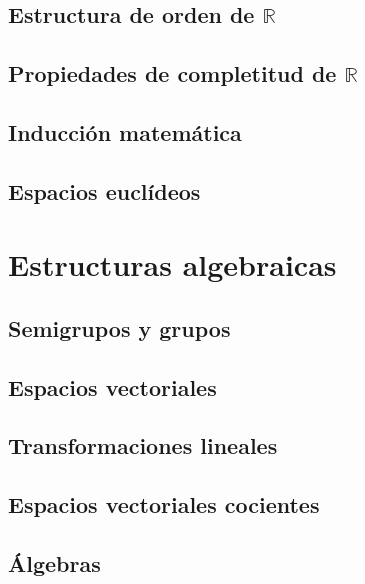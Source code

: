 \documentclass[12pt,]{krantz}
\theoremstyle{definition}
\theoremstyle{definition}
\theoremstyle{definition}
\theoremstyle{remark}
\begin{document}
\section{\texorpdfstring{Estructura de orden de
\(\mathbb{R}\)}{Estructura de orden de \textbackslash{}mathbb\{R\}}}\label{estructura-de-orden-de-mathbbr}

\section{\texorpdfstring{Propiedades de completitud de
\(\mathbb{R}\)}{Propiedades de completitud de \textbackslash{}mathbb\{R\}}}\label{propiedades-de-completitud-de-mathbbr}

\section{Inducción matemática}\label{induccion-matematica}

\section{Espacios euclídeos}\label{espacios-euclideos}

\chapter{Estructuras algebraicas}\label{estructuras-algebraicas}

\section{Semigrupos y grupos}\label{semigrupos-y-grupos}

\section{Espacios vectoriales}\label{espacios-vectoriales}

\section{Transformaciones lineales}\label{transformaciones-lineales}

\section{Espacios vectoriales
cocientes}\label{espacios-vectoriales-cocientes}

\section{Álgebras}\label{algebras}
\end{document}
